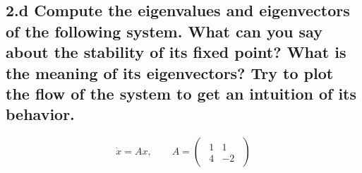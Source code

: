 \documentclass{cmc}
\begin{document}
\clearpage

\subsection*{2.d Compute the eigenvalues and eigenvectors of the following system.
What can you say about the stability of its fixed point? What is the meaning of its
eigenvectors? Try to plot the flow of the system to get an intuition of its behavior.}

  \begin{equation}
    \label{eq:saddle-system}
    \dot{x} = A x,
    \qquad
    A =
    \begin{pmatrix}
      \begin{array}{rr}
        1 & 1 \\
        4 & -2
      \end{array}
    \end{pmatrix}
  \end{equation}





\end{document}
